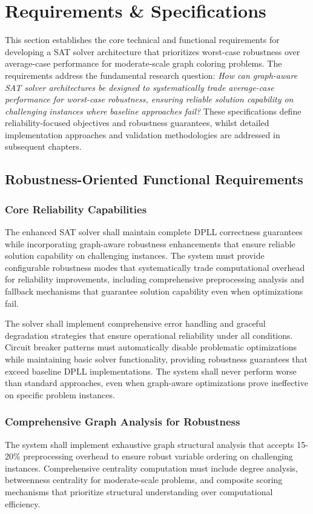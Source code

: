 \section{Requirements \& Specifications}

This section establishes the core technical and functional requirements for developing a SAT solver architecture that prioritizes worst-case robustness over average-case performance for moderate-scale graph coloring problems. The requirements address the fundamental research question: \emph{How can graph-aware SAT solver architectures be designed to systematically trade average-case performance for worst-case robustness, ensuring reliable solution capability on challenging instances where baseline approaches fail?} These specifications define reliability-focused objectives and robustness guarantees, whilst detailed implementation approaches and validation methodologies are addressed in subsequent chapters.

\subsection{Robustness-Oriented Functional Requirements}

\subsubsection{Core Reliability Capabilities}
The enhanced SAT solver shall maintain complete DPLL correctness guarantees while incorporating graph-aware robustness enhancements that ensure reliable solution capability on challenging instances. The system must provide configurable robustness modes that systematically trade computational overhead for reliability improvements, including comprehensive preprocessing analysis and fallback mechanisms that guarantee solution capability even when optimizations fail.

The solver shall implement comprehensive error handling and graceful degradation strategies that ensure operational reliability under all conditions. Circuit breaker patterns must automatically disable problematic optimizations while maintaining basic solver functionality, providing robustness guarantees that exceed baseline DPLL implementations. The system shall never perform worse than standard approaches, even when graph-aware optimizations prove ineffective on specific problem instances.

\subsubsection{Comprehensive Graph Analysis for Robustness}
The system shall implement exhaustive graph structural analysis that accepts 15-20\% preprocessing overhead to ensure robust variable ordering on challenging instances. Comprehensive centrality computation must include degree analysis, betweenness centrality for moderate-scale problems, and composite scoring mechanisms that prioritize structural understanding over computational efficiency.

